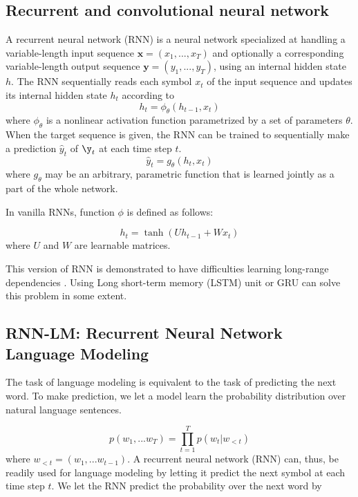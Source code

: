 \subsection{Recurrent and convolutional neural network}
A recurrent neural network (RNN) is a neural network specialized at handling a variable-length input sequence $\mathbf{x}=(x_1,...,x_T)$ and optionally a corresponding variable-length output sequence $\mathbf{y}=(y_1,...,y_T)$, using an internal hidden state $h$. The RNN sequentially reads each symbol $x_t$ of the input sequence and updates its internal hidden state $h_t$ according to
\begin{equation}
h_t=\phi_\theta(h_{t-1},x_t)
\end{equation}
where $\phi_\theta$ is a nonlinear activation function parametrized by a set of parameters $\theta$. When the target sequence is given, the RNN can be trained to sequentially make a prediction $\hat{y}_t$ of $\y_t$ at each time step $t$.
\begin{equation}
\hat{y}_t=g_\theta(h_{t},x_t)
\end{equation}
where $g_\theta$ may be an arbitrary, parametric function that is learned jointly as a part of the whole network.

In vanilla RNNs, function $\phi$ is defined as follows:

\begin{equation}
h_t=\tanh(Uh_{t-1}+Wx_t)
\end{equation}
where $U$ and $W$ are learnable matrices.

This version of RNN is demonstrated to have difficulties learning long-range dependencies \cite{hochreiter1991untersuchungen,pascanu2013difficulty}. Using Long short-term memory (LSTM) unit \cite{hochreiter1997long} or GRU \cite{chung2014empirical,cho2014learning} can solve this problem in some extent.

\subsection{RNN-LM: Recurrent Neural Network Language Modeling}
The task of language modeling is equivalent to the task of predicting the next word. To make prediction, we let a model learn the probability distribution over natural language sentences.

\begin{equation}
p(w_1,...w_T)=\prod_{t=1}^{T}p(w_t|w_{<t})
\end{equation}
where $w_{<t}=(w_1,...w_{t-1})$. A recurrent neural network (RNN) can, thus, be readily used for language modeling by letting it predict the next symbol at each time step $t$. We let the RNN
predict the probability over the next word by


